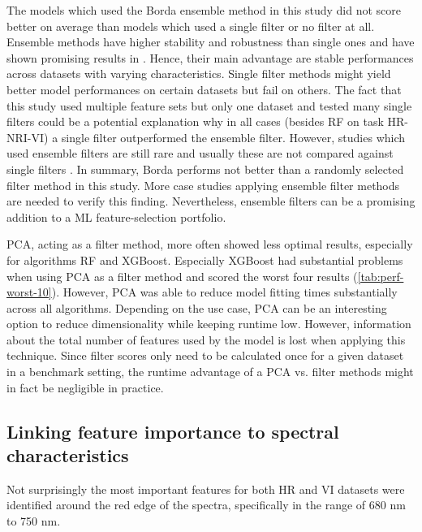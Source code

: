 \documentclass[final]{IEEEtran}
\begin{document}
The models which used the Borda ensemble method in this study did not score better on average than models which used a single filter or no filter at all.
Ensemble methods have higher stability and robustness than single ones and have shown promising results in \cite{drotar2017a}.
Hence, their main advantage are stable performances across datasets with varying characteristics.
Single filter methods might yield better model performances on certain datasets but fail on others.
The fact that this study used multiple feature sets but only one dataset and tested many single filters could be a potential explanation why in all cases (besides RF on task HR-NRI-VI) a single filter outperformed the ensemble filter.
However, studies which used ensemble filters are still rare and usually these are not compared against single filters \cite{ghosh2019}.
In summary, Borda performs not better than a randomly selected filter method in this study.
More case studies applying ensemble filter methods are needed to verify this finding.
Nevertheless, ensemble filters can be a promising addition to a ML feature-selection portfolio.

PCA, acting as a filter method, more often showed less optimal results, especially for algorithms RF and XGBoost.
Especially XGBoost had substantial problems when using PCA as a filter method and scored the worst four results (\autoref{tab:perf-worst-10}).
However, PCA was able to reduce model fitting times substantially across all algorithms.
Depending on the use case, PCA can be an interesting option to reduce dimensionality while keeping runtime low.
However, information about the total number of features used by the model is lost when applying this technique.
Since filter scores only need to be calculated once for a given dataset in a benchmark setting, the runtime advantage of a PCA vs. filter methods might in fact be negligible in practice.

\subsection{Linking feature importance to spectral characteristics}

Not surprisingly the most important features for both HR and VI datasets were identified around the red edge of the spectra, specifically in the range of 680 nm to 750 nm.
\end{document}
